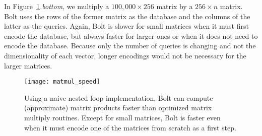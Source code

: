 In Figure~\ref{fig:matmul_speed}\textit{.bottom}, we multiply a $100,000 \times 256$ matrix by a $256 \times n$ matrix. Bolt uses the rows of the former matrix as the database and the columns of the latter as the queries. Again, Bolt is slower for small matrices when it must first encode the database, but always faster for larger ones or when it does not need to encode the database. Because only the number of queries is changing and not the dimensionality of each vector, longer encodings would not be necessary for the larger matrices.


\begin{figure}[h]
\begin{center}
\texttt{[image: matmul\_speed]}
\caption{Using a naive nested loop implementation, Bolt can compute (approximate) matrix products faster than optimized matrix multiply routines. Except for small matrices, Bolt is faster even when it must encode one of the matrices from scratch as a first step.}
\label{fig:matmul_speed}
\end{center}
\end{figure}








